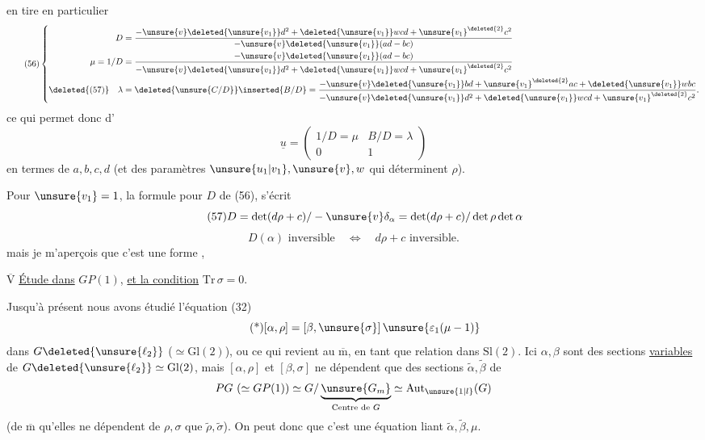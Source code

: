  en tire en particulier
\[
\tag{56}
\left\{
\begin{aligned}
D&=\frac{-\unsure{v}\deleted{\unsure{v_1}}d^2+
\deleted{\unsure{v_1}}wcd+\unsure{v_1}^{\deleted{2}}c^2}
{-\unsure{v}\deleted{\unsure{v_1}}(ad-bc)}\\
\mu=1/D&=\frac{-\unsure{v}\deleted{\unsure{v_1}}(ad-bc)}
{-\unsure{v}\deleted{\unsure{v_1}}d^2+
\deleted{\unsure{v_1}}wcd+\unsure{v_1}^{\deleted{2}}c^2}\\
\deleted{(57)}\quad\lambda&=\deleted{\unsure{C/D}}\inserted{B/D}
=\frac{-\unsure{v}\deleted{\unsure{v_1}}bd+\unsure{v_1}^{\deleted{2}}ac+
\deleted{\unsure{v_1}}wbc}
{-\unsure{v}\deleted{\unsure{v_1}}d^2+
\deleted{\unsure{v_1}}wcd+\unsure{v_1}^{\deleted{2}}c^2}.
\end{aligned}
\right.
\]
ce qui permet donc d'
\[
\underline{u}=\begin{pmatrix}1/D=\mu&B/D=\lambda\\0&1\end{pmatrix}
\]
en termes de $a,b,c,d$ (et des paramètres $\unsure{u_1|v_1},\unsure{v},w$
qui déterminent $\rho$).

Pour \uline{$\unsure{v_1}=1$}, la formule pour $D$ de (56), s'écrit
\[
\tag{57}
D=\det(d\rho+c)/-\unsure{v}\delta_\alpha
=\det(d\rho+c)/\det\rho\det\alpha
\]
\[
\tag{58}
D(\alpha)\text{ inversible}\quad\Longleftrightarrow\quad
d\rho+c\text{ inversible}.
\]
mais je m'aperçois que c'est une forme ,


\uline{$\overline{\mathrm V}$}\qquad
\uline{Étude}\uline{ dans}
$GP(1)$, \uline{et la condition} $\mathrm{Tr}\,\sigma=0$.

Jusqu'à présent nous avons étudié l'équation (32)
\[
\tag{*}
[\alpha,\rho]=[\beta,\unsure{\sigma}]\,
\unsure{\varepsilon_1(\mu-1)}
\]
dans $G\deleted{\unsure{\ell_2}}$ ($\simeq\mathrm{Gl}(2)$), ou ce qui revient au
$\overline{\mathrm m}$,  en tant que relation dans $\mathrm{Sl}(2)$.
Ici $\alpha,\beta$ sont des sections \uline{variables} de
$G\deleted{\unsure{\ell_2}}\simeq\mathrm{Gl}(2)$, mais $[\alpha,\rho]$ et
$[\beta,\sigma]$ ne dépendent que des sections 
$\widetilde\alpha,\widetilde\beta$ de
\[
PG\ (\simeq GP(1))\simeq
G/\underbrace{\unsure{G_m}}_{\text{Centre de }G}
\simeq\mathrm{Aut}_{\unsure{1|l}}(G)
\]
(de $\overline{\mathrm m}$ qu'elles ne dépendent de $\rho,\sigma$ que
 $\widetilde\rho,\widetilde\sigma$).
On peut donc  que c'est une équation
liant $\widetilde\alpha,\widetilde\beta,\mu$.

